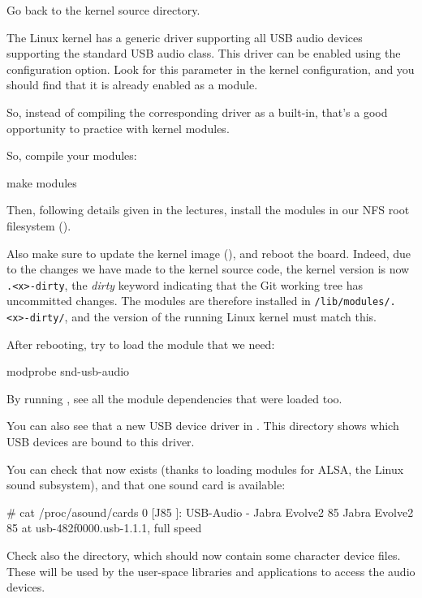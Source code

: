 {Go back to the kernel source directory.

The Linux kernel has a generic driver supporting all USB audio devices
supporting the standard USB audio class. This driver can be enabled
using the  configuration option. Look
for this parameter in the kernel configuration, and you should find
that it is already enabled as a module.

So, instead of compiling the corresponding driver as a built-in, that's
a good opportunity to practice with kernel modules.

So, compile your modules:
\begin{bashinput}
make modules
\end{bashinput}

Then, following details given in the lectures, install the modules in our NFS
root filesystem ().

Also make sure to update the kernel image (), and reboot the
board.  Indeed, due to the changes we have made to the kernel source code,
the kernel version is now {\tt \workingkernel.<x>-dirty}, the {\em dirty}
keyword indicating that the Git working tree has uncommitted changes.
The modules are therefore installed in {\tt /lib/modules/\workingkernel.<x>-dirty/},
and the version of the running Linux kernel must match this.

After rebooting, try to load the module that we need:

\begin{bashinput}
modprobe snd-usb-audio
\end{bashinput}

By running , see all the module dependencies that
were loaded too.

You can also see that a new USB device driver in
. This directory shows which
USB devices are bound to this driver.

You can check that  now exists (thanks to loading
modules for ALSA, the Linux sound subsystem), and that one sound
card is available:

\begin{bashinput}
# cat /proc/asound/cards
 0 [J85            ]: USB-Audio - Jabra Evolve2 85
                      Jabra Evolve2 85 at usb-482f0000.usb-1.1.1, full speed
\end{bashinput}

Check also the  directory, which should now contain
some character device files. These will be used by the user-space
libraries and applications to access the audio devices.

}
